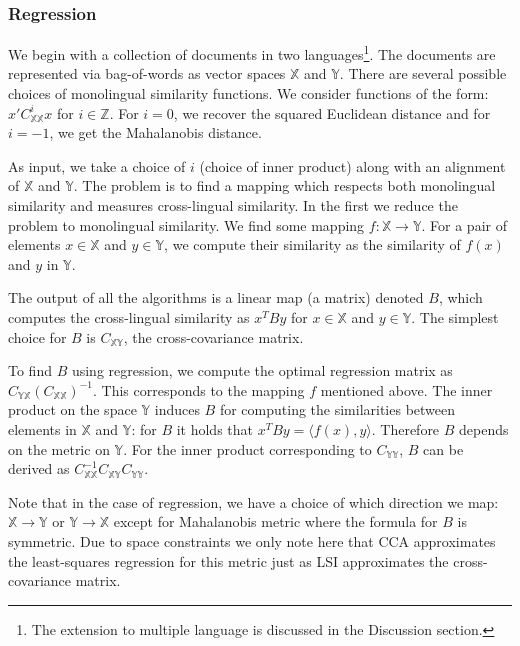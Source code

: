 \documentclass[twoside,11pt]{article}
\newcommand{\X}{\mathbb{X}}
\newcommand{\Y}{\mathbb{Y}}
\begin{document}
\subsubsection{Regression}

We begin with a collection of documents in two languages\footnote{The extension to multiple language is  discussed in the Discussion section.}. The documents are represented via bag-of-words as vector spaces $\X$ and $\Y$. There are several possible choices of monolingual similarity functions. We consider functions of the form: $x'C_{\X\X}^i x$ for $i\in \mathbb{Z}$. For $i=0$, we recover the squared Euclidean distance and for $i=-1$, we get the Mahalanobis distance.

As input, we take a choice of $i$ (choice of inner product) along with an alignment of $\X$ and $\Y$. The problem is to find a mapping which respects both monolingual similarity and measures cross-lingual similarity.  In the first we reduce the problem to monolingual similarity. We find some mapping $f: \X \rightarrow \Y$. For a pair of elements $x\in\X$ and $y\in\Y$, we compute their similarity as the similarity of $f(x)$ and $y$ in $\Y$.

The output of all the algorithms is a linear map (a matrix) denoted $B$, which computes the cross-lingual similarity as $x^T B y$ for $x\in\X$ and $y \in \Y$. The simplest choice for $B$ is $C_{\X\Y}$, the cross-covariance matrix.

To find $B$ using regression, we compute the optimal regression matrix as $ C_{\Y \X} (C_{\X \X})^{-1}$. This corresponds to the mapping $f$ mentioned above.  The inner product on the space $\Y$ induces $B$ for computing the similarities between elements in $\X$ and $\Y$: for $B$ it holds that $x^T B y = \langle f (x), y \rangle$. Therefore $B$ depends on the metric on $\Y$. For the inner product corresponding to $C_{\Y\Y}$, $B$ can be derived as $C_{\X \X}^{-1}C_{\X \Y}C_{\Y \Y}$.

Note that in the case of regression, we have a choice of which direction we map: $\X\rightarrow\Y$ or $\Y\rightarrow\X$ except for Mahalanobis metric where the formula for $B$ is symmetric. Due to space constraints we only note here that CCA approximates the least-squares regression for this metric just as LSI approximates the cross-covariance matrix.
\end{document}

